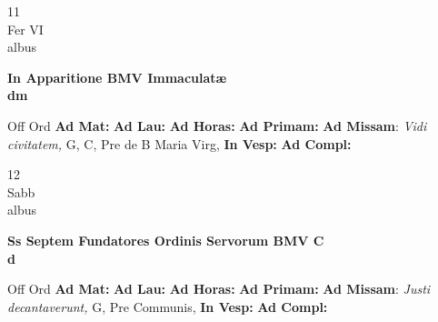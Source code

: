 \documentclass[10pt, openany]{book}
\begin{document}
    \begin{center}
        \begin{minipage}{3.5in}
            \vspace{2em}
            \begin{minipage}{0.5in}
                {\Huge 11} \\
                {\normalsize Fer VI} \\
                {\normalsize albus}
            \end{minipage}
            \begin{minipage}{3.0in}
                \textbf{ \large In Apparitione BMV Immaculatæ \\
                \textnormal{\normalsize dm}} \\ 
            \end{minipage}
            \begin{justify}Off Ord
                \textbf{Ad Mat: }
                \textbf{Ad Lau: }
                \textbf{Ad Horas: }
                \textbf{Ad Primam: }\textbf{Ad Missam}: \textit{Vidi civitatem,} G, C, Pre de B Maria Virg,  
                \textbf{In Vesp: }
                \textbf{Ad Compl: }
            \end{justify}
        \end{minipage}
    \end{center}

    \begin{center}
        \begin{minipage}{3.5in}
            \vspace{2em}
            \begin{minipage}{0.5in}
                {\Huge 12} \\
                {\normalsize Sabb} \\
                {\normalsize albus}
            \end{minipage}
            \begin{minipage}{3.0in}
                \textbf{ \large Ss Septem Fundatores Ordinis Servorum BMV C \\
                \textnormal{\normalsize d}} \\ 
            \end{minipage}
            \begin{justify}Off Ord
                \textbf{Ad Mat: }
                \textbf{Ad Lau: }
                \textbf{Ad Horas: }
                \textbf{Ad Primam: }\textbf{Ad Missam}: \textit{Justi decantaverunt,} G, Pre Communis,  
                \textbf{In Vesp: }
                \textbf{Ad Compl: }
            \end{justify}
        \end{minipage}
    \end{center}
\end{document}
